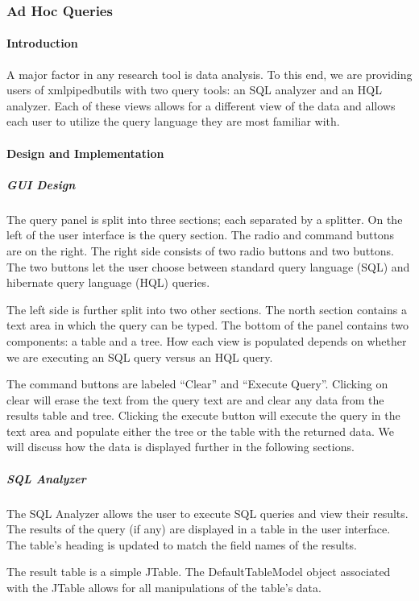 \subsubsection{Ad Hoc Queries}

\paragraph{Introduction}
A major factor in any research tool is data analysis. To this end, we are providing users of xmlpipedbutils with two query tools: an SQL analyzer and an HQL analyzer. Each of these views allows for a different view of the data and allows each user to utilize the query language they are most familiar with.

\paragraph{Design and Implementation}

\subparagraph{GUI Design}

The query panel is split into three sections; each separated by a splitter. On the left of the user interface is the query section. The radio and command buttons are on the right. The right side consists of two radio buttons and two buttons. The two buttons let the user choose between standard query language (SQL) and hibernate query language (HQL) queries. 

The left side is further split into two other sections. The north section contains a text area in which the query can be typed. The bottom of the panel contains two components: a table and a tree. How each view is populated depends on whether we are executing an SQL query versus an HQL query.

The command buttons are labeled ``Clear'' and ``Execute Query''. Clicking on clear will erase the text from the query text are and clear any data from the results table and tree. Clicking the execute button will execute the query in the text area and populate either the tree or the table with the returned data. We will discuss how the data is displayed further in the following sections.

\subparagraph{SQL Analyzer}

The SQL Analyzer allows the user to execute SQL queries and view their results. The results of the query (if any) are displayed in a table in the user interface. The table's heading is updated to match the field names of the results.

The result table is a simple JTable. The DefaultTableModel object associated with the JTable allows for all manipulations of the table's data.

